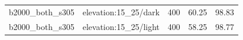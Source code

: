 \begin{longtable}{l>{\raggedright\arraybackslash}p{.42\linewidth}rrr}
b2000\_\allowbreak{}both\_\allowbreak{}s305 & %
elevation:15\_\allowbreak{}25/dark & %
400 & %
60.25 & %
98.83 \\ %

b2000\_\allowbreak{}both\_\allowbreak{}s305 & %
elevation:15\_\allowbreak{}25/light & %
400 & %
58.25 & %
98.77 \\ %


\end{longtable}
